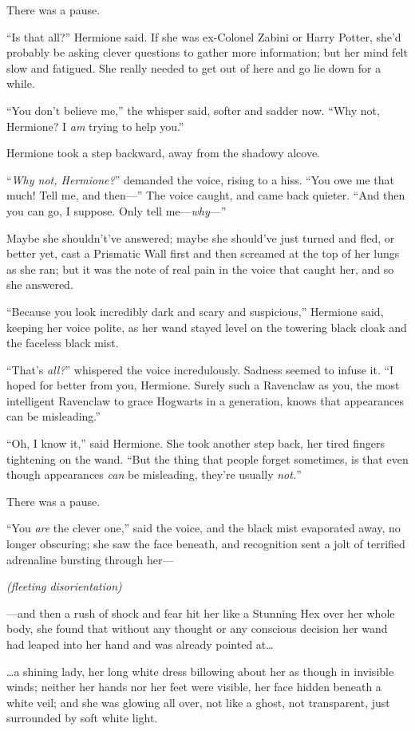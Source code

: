 There was a pause.

“Is that all?” Hermione said. If she was ex-Colonel Zabini or Harry Potter, she’d probably be asking clever questions to gather more information; but her mind felt slow and fatigued. She really needed to get out of here and go lie down for a while.

“You don’t believe me,” the whisper said, softer and sadder now. “Why not, Hermione? I \emph{am} trying to help you.”

Hermione took a step backward, away from the shadowy alcove.

“\emph{Why not, Hermione?}” demanded the voice, rising to a hiss. “You owe me that much! Tell me, and then—” The voice caught, and came back quieter. “And then you can go, I suppose. Only tell me—\emph{why}—”

Maybe she shouldn’t’ve answered; maybe she should’ve just turned and fled, or better yet, cast a Prismatic Wall first and then screamed at the top of her lungs as she ran; but it was the note of real pain in the voice that caught her, and so she answered.

“Because you look incredibly dark and scary and suspicious,” Hermione said, keeping her voice polite, as her wand stayed level on the towering black cloak and the faceless black mist.

“That’s \emph{all?}” whispered the voice incredulously. Sadness seemed to infuse it. “I hoped for better from you, Hermione. Surely such a Ravenclaw as you, the most intelligent Ravenclaw to grace Hogwarts in a generation, knows that appearances can be misleading.”

“Oh, I know it,” said Hermione. She took another step back, her tired fingers tightening on the wand. “But the thing that people forget sometimes, is that even though appearances \emph{can} be misleading, they’re usually \emph{not.}”

There was a pause.

“You \emph{are} the clever one,” said the voice, and the black mist evaporated away, no longer obscuring; she saw the face beneath, and recognition sent a jolt of terrified adrenaline bursting through her—

\emph{(fleeting disorientation)}

—and then a rush of shock and fear hit her like a Stunning Hex over her whole body, she found that without any thought or any conscious decision her wand had leaped into her hand and was already pointed at…

…a shining lady, her long white dress billowing about her as though in invisible winds; neither her hands nor her feet were visible, her face hidden beneath a white veil; and she was glowing all over, not like a ghost, not transparent, just surrounded by soft white light.

